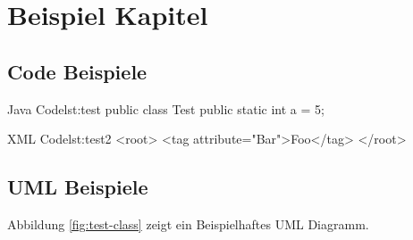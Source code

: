 \chapter{Beispiel Kapitel}

\lipsum
\cite{internet}

\section{Code Beispiele}

\begin{java}{Java Code}{lst:test}
public class Test {
	public static int a = 5;
}
\end{java}

\begin{xml}{XML Code}{lst:test2}
<root>
	<tag attribute="Bar">Foo</tag>
</root>
\end{xml}

\section{UML Beispiele}


Abbildung \ref{fig:test-class} zeigt ein Beispielhaftes UML Diagramm.
